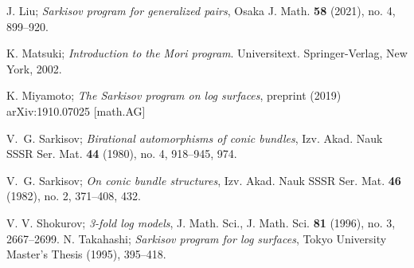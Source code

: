 \documentclass[11pt]{amsart}
\begin{document}
\begin{thebibliography}{99}
  J. Liu;
  \textit{Sarkisov program for generalized pairs},
  Osaka J. Math. \textbf{58} (2021), no. 4, 899–920.

   K. Matsuki; \textit{Introduction to the Mori program}. Universitext. Springer-Verlag, New York, 2002.

  K. Miyamoto;
  \textit{The Sarkisov program on log surfaces},
  preprint (2019) arXiv:1910.07025 [math.AG]

  V.~G. Sarkisov;
  \textit{{Birational automorphisms of conic bundles}},
  Izv. Akad. Nauk SSSR Ser. Mat. \textbf{44} (1980), no. 4, 918–945, 974.

  V.~G. Sarkisov;
  \textit{On conic bundle structures},
  Izv. Akad. Nauk SSSR Ser. Mat. \textbf{46} (1982), no. 2, 371–408, 432.


  V. V. Shokurov;
  \textit{3-fold log models}, J. Math. Sci.,
  J. Math. Sci. \textbf{81} (1996), no. 3, 2667–2699.
  N. Takahashi;
  \textit{Sarkisov program for log surfaces},
  Tokyo University Master's Thesis (1995), 395--418.
\end{thebibliography}
\end{document}
